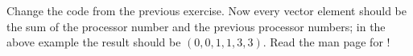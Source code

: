   Change the code from the previous exercise. Now every vector element
  should be the sum of the processor number and the previous
  processor numbers; in the above example the result should be
  $(0,0,1,1,3,3)$. Read the man page for !
